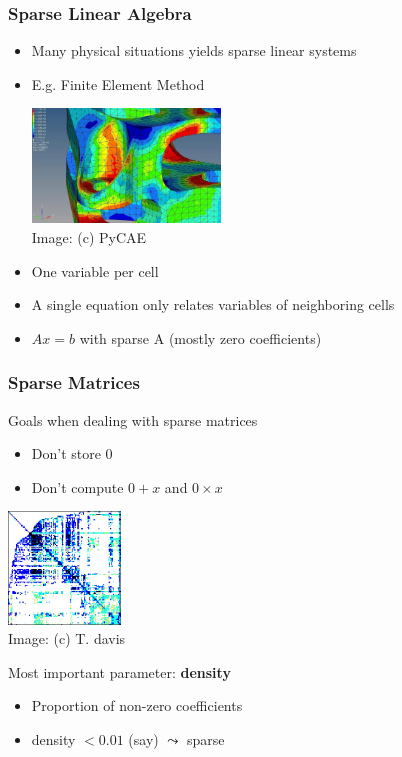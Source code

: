 \documentclass[xcolor={rgb,x11names,svgnames},rgb,x11names,svgnames]{beamer}
\newcommand{\red}{\alert}
\begin{document}
\begin{frame}
  \frametitle{\textbf{Sparse} Linear Algebra}

  \begin{itemize}
  \item Many physical situations yields \red{sparse} linear systems
  \item E.g. Finite Element Method
    \begin{center}
      \includegraphics[width=5cm]{fem_sample} \\
      {\tiny Image: (c) PyCAE} 
    \end{center}
    
  \item One variable per cell
  \item A single equation \red{only} relates variables of \red{neighboring} cells
  \item $Ax = b$ with \red{sparse} A (mostly zero coefficients)
  \end{itemize}
\end{frame}


\begin{frame}
  \frametitle{Sparse Matrices}

  \begin{block}{Goals when dealing with sparse matrices}
    \begin{itemize}
    \item Don't store 0
    \item Don't compute $0 + x$ and $0 \times x$
    \end{itemize}
  \end{block}
  
  \begin{center}
    \includegraphics[width=3cm]{sparse.png} \\
    {\tiny Image: (c) T. davis} 
  \end{center}
  
  \begin{block}{Most important parameter: \textbf{density}}
    \begin{itemize}
    \item Proportion of \red{non-zero} coefficients
    \item density $< 0.01$ (say) $\leadsto$ sparse
    \end{itemize}
  \end{block}
  
\end{frame}
\end{document}
